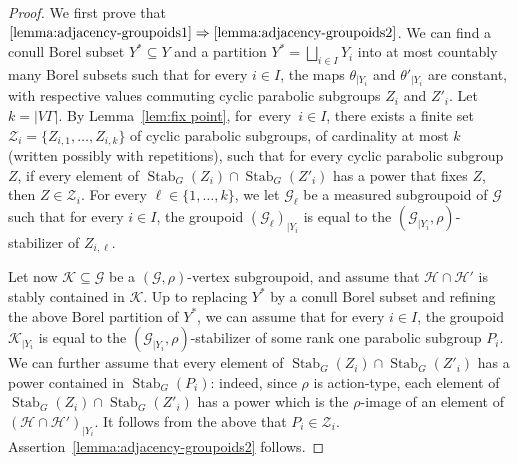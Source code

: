 \documentclass[JEP,XML,SOM,Unicode,NoFloatCountersInSection,published]{cedram}
\let\mathcal\mathscr
\theoremstyle{plain}
\theoremstyle{definition}
\let\Dunion\bigsqcup
\newcommand{\calg}{\mathcal{G}}
\newcommand{\calh}{\mathcal{H}}
\newcommand{\calk}{\mathcal{K}}
\newcommand{\calz}{\mathcal{Z}}
\newcommand{\Stab}{\operatorname{Stab}}
\begin{document}
\begin{proof}
We first prove that $\eqref{lemma:adjacency-groupoids1}\Rightarrow \eqref{lemma:adjacency-groupoids2}$. We can find a conull Borel subset $Y^*\subseteq Y$ and a partition $Y^*=\Dunion_{i\in I} Y_i$ into at most countably many Borel subsets such that for every $i\in I$, the maps $\theta_{|Y_i}$ and $\theta'_{|Y_i}$ are constant, with respective values commuting cyclic parabolic subgroups $Z_i$ and $Z'_i$. Let $k\!=\!|V\Gamma|$. By Lemma~\ref{lem:fix point}, for~every~\hbox{$i\!\in\!I$}, there exists a finite set $\calz_i=\{Z_{i,1},\dots,Z_{i,k}\}$ of cyclic parabolic subgroups, of cardinality at most $k$ (written possibly with repetitions), such that for every cyclic parabolic subgroup $Z$, if every element of $\Stab_G(Z_{i})\cap\Stab_G(Z'_i)$ has a power that fixes $Z$, then $Z\in\calz_i$. For every $\ell\in\{1,\dots,k\}$, we let $\calg_\ell$ be a measured subgroupoid of $\calg$ such that for every $i\in I$, the groupoid $(\calg_\ell)_{|Y_i}$ is equal to the $(\calg_{|Y_i},\rho)$-stabilizer of $Z_{i,\ell}$.

Let now $\calk\subseteq\calg$ be a $(\calg,\rho)$-vertex subgroupoid, and assume that $\calh\cap\calh'$ is stably contained in $\calk$. Up to replacing $Y^*$ by a conull Borel subset and refining the above Borel partition of $Y^*$, we can assume that for every $i\in I$, the groupoid $\calk_{|Y_i}$ is equal to the $(\calg_{|Y_i},\rho)$-stabilizer of some rank one parabolic subgroup $P_i$. We can further assume that every element of $\Stab_G(Z_i)\cap\Stab_G(Z'_i)$ has a power contained in $\Stab_G(P_i)$: indeed, since $\rho$ is action-type, each element of $\Stab_G(Z_i)\cap\Stab_G(Z'_i)$ has a power which is the $\rho$-image of an element of $(\calh\cap\calh')_{|Y_i}$. It follows from the above that $P_i\in\calz_i$. Assertion~\eqref{lemma:adjacency-groupoids2} follows.


\end{proof}
\end{document}
